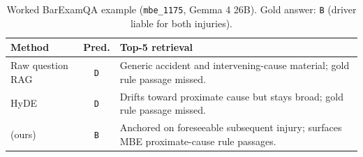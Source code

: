 \begin{table}[H]
\centering
\caption{Worked BarExamQA example (\texttt{mbe\_1175}, Gemma 4 26B). Gold
answer: \texttt{B} (driver liable for both injuries).}
\label{tab:worked_examples}
\footnotesize
\begin{tabularx}{\columnwidth}{lcY}
\toprule
Method & Pred. & Top-5 retrieval \\
\midrule
Raw question RAG & \texttt{D} 
& Generic accident and intervening-cause material; gold rule passage missed. \\
\addlinespace
HyDE & \texttt{D} 
& Drifts toward proximate cause but stays broad; gold rule passage missed. \\
\addlinespace
\hyre{} (ours) & \texttt{B} 
& Anchored on foreseeable subsequent injury; surfaces MBE proximate-cause rule passages. \\
\bottomrule
\end{tabularx}
\end{table}
